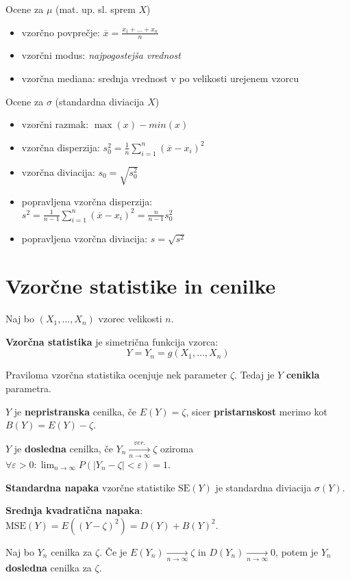 \begin{multicols}{5}
Ocene za $\mu$ (mat. up. sl. sprem $X$)
\begin{itemize}
    \item vzorčno povprečje: $\overline{x} = \frac{x_1 + \dots + x_n}{n}$
    \item vzorčni modus: \textit{najpogostejša vrednost}
    \item vzorčna mediana: srednja vrednost v po velikosti urejenem vzorcu
\end{itemize}
Ocene za $\sigma$ (standardna diviacija $X$)
\begin{itemize}
    \item vzorčni razmak: $\max(x) - min(x)$
    \item vzorčna disperzija: $s_0^2 = \frac{1}{n} \sum_{i=1}^n (\overline{x} - x_i)^2$
    \item vzorčna diviacija: $s_0 = \sqrt{s_0^2}$
    \item popravljena vzorčna disperzija: \\ $s^2 = \frac{1}{n-1} \sum_{i=1}^n (\overline{x} - x_i)^2 = \frac{n}{n-1} s_0^2$
    \item popravljena vzorčna diviacija: $s = \sqrt{s^2}$
\end{itemize}


\section{Vzorčne statistike in cenilke}
Naj bo $(X_1, \dots, X_n)$ vzorec velikosti $n$.

\textbf{Vzorčna statistika} je simetrična funkcija vzorca:
\[ Y = Y_n = g(X_1, \dots, X_n)\]

Praviloma vzorčna statistika ocenjuje nek parameter $\zeta$. Tedaj je $Y$ \textbf{cenikla} parametra.

$Y$ je \textbf{nepristranska} cenilka, če $E(Y) = \zeta$, sicer \textbf{pristarnskost} merimo kot $B(Y) = E(Y) - \zeta$.

$Y$ je \textbf{dosledna} cenilka, če $Y_n \xrightarrow[n \to \infty]{ver.} \zeta$ oziroma $\forall \varepsilon > 0: \lim_{n\to \infty} P(|Y_n - \zeta| < \varepsilon) = 1$.

\textbf{Standardna napaka} vzorčne statistike $\text{SE}(Y)$ je standardna diviacija $\sigma(Y)$.

\textbf{Srednja kvadratična napaka}: $\text{MSE}(Y) = E((Y-\zeta)^2) = D(Y) + B(Y)^2$.


Naj bo $Y_n$ cenilka za $\zeta$. Če je $E(Y_n) \xrightarrow[n \to \infty]{} \zeta$ in $D(Y_n) \xrightarrow[n \to \infty]{} 0$, potem je $Y_n$ \textbf{dosledna} cenilka za $\zeta$.



\end{multicols}
